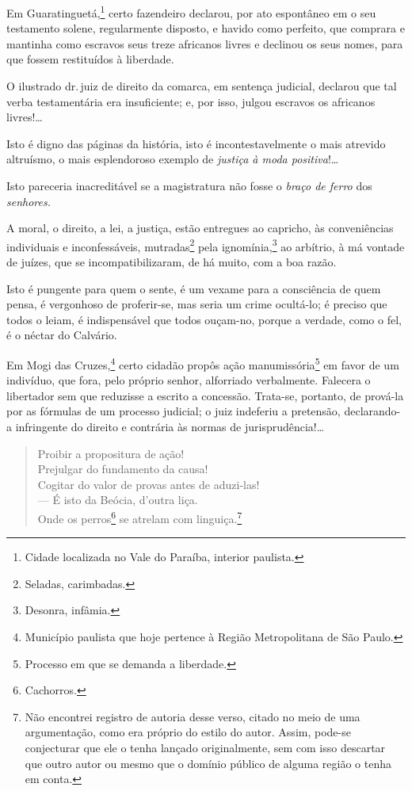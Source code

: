 {
Em Guaratinguetá,\footnote{Cidade localizada no Vale do Paraíba,
  interior paulista.} certo fazendeiro declarou, por ato espontâneo em
o seu testamento solene, regularmente disposto, e havido como perfeito,
que comprara e mantinha como escravos seus treze africanos livres e
declinou os seus nomes, para que fossem restituídos à liberdade.

O ilustrado dr.\,juiz de direito da comarca, em sentença judicial,
declarou que tal verba testamentária era insuficiente; e, por isso,
julgou escravos os africanos livres!\ldots{}

Isto é digno das páginas da história, isto é incontestavelmente o mais
atrevido altruísmo, o mais esplendoroso exemplo de \emph{justiça à moda
positiva}!\ldots{}

Isto pareceria inacreditável se a magistratura não fosse o \emph{braço
de ferro} dos \emph{senhores.}

A moral, o direito, a lei, a justiça, estão entregues ao capricho, às
conveniências individuais e inconfessáveis, mutradas\footnote{Seladas,
  carimbadas.} pela ignomínia,\footnote{Desonra, infâmia.} ao
arbítrio, à má vontade de juízes, que se incompatibilizaram, de há
muito, com a boa razão.

Isto é pungente para quem o sente, é um vexame para a consciência de
quem pensa, é vergonhoso de proferir-se, mas seria um crime ocultá-lo; é
preciso que todos o leiam, é indispensável que todos ouçam-no, porque a
verdade, como o fel, é o néctar do Calvário.

Em Mogi das Cruzes,\footnote{Município paulista que hoje pertence à
  Região Metropolitana de São Paulo.} certo cidadão propôs ação
manumissória\footnote{Processo em que se demanda a liberdade.} em
favor de um indivíduo, que fora, pelo próprio senhor, alforriado
verbalmente. Falecera o libertador sem que reduzisse a escrito a
concessão. Trata-se, portanto, de prová-la por as fórmulas de um
processo judicial; o juiz indeferiu a pretensão, declarando-a
infringente do direito e contrária às normas de jurisprudência!\ldots{}

\begin{verse}
Proibir a propositura de ação!\\
Prejulgar do fundamento da causa!\\
Cogitar do valor de provas antes de aduzi-las!\\
--- É isto da Beócia, d'outra liça.\\
Onde os perros\footnote{Cachorros.} se atrelam com linguiça.\footnote{
  Não encontrei registro de autoria desse verso, citado no meio de uma
  argumentação, como era próprio do estilo do autor. Assim, pode-se
  conjecturar que ele o tenha lançado originalmente, sem com isso
  descartar que outro autor ou mesmo que o domínio público de alguma
  região o tenha em conta.}
\end{verse}  

}
